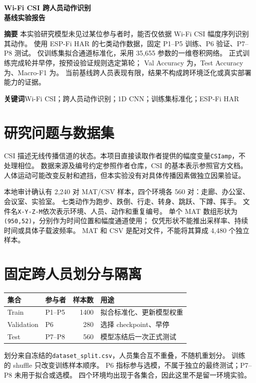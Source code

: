\documentclass[UTF8,zihao=-4,fontset=none]{ctexart}
\newcommand{\nextsection}{\FloatBarrier\Needspace{5\baselineskip}}
\begin{document}
\begin{center}
{\LARGE\sffamily\bfseries Wi-Fi CSI 跨人员动作识别\\[5pt]基线实验报告}\par
\vspace{5pt}{\large ESP32 / ESP-Fi HAR / LightweightCNN}\par
\vspace{4pt}{\small 一次固定划分、单一随机种子的冻结实验}
\end{center}
\noindent\textbf{摘要}\quad
本实验研究模型未见过某位参与者时，能否仅依据 Wi-Fi CSI 幅度序列识别其动作。
使用 ESP-Fi HAR 的七类动作数据，固定 P1--P5 训练、P6 验证、P7--P8 测试。
仅训练集拟合通道标准化，采用 35,655 参数的一维卷积网络。
正式训练完成\ActualEpochs{}轮并早停，按预设验证规则选定第\BestEpoch{}轮；
Val Accuracy 为\ValAcc{}，Test Accuracy 为\TestAcc{}、Macro-F1 为\TestFOne{}。
当前基线跨人员表现有限，结果不构成跨环境泛化或真实部署能力的证据。

\noindent\textbf{关键词}\quad Wi-Fi CSI；跨人员动作识别；1D CNN；训练集标准化；ESP-Fi HAR

\nextsection
\section{研究问题与数据集}
CSI 描述无线传播信道的状态。本项目直接读取作者提供的幅度变量\texttt{CSIamp}，不处理相位。
数据来源及编号约定参照作者仓库\cite{espfi}，CSI 的基本表示参照官方文档\cite{espcsi}。
人体运动可能改变反射和遮挡，但本实验没有对具体传播因素做独立因果验证。

本地审计确认有 2,240 对 MAT/CSV 样本，四个环境各 560 对：走廊、办公室、会议室、实验室。
七类动作为跑步、跌倒、行走、转身、跳跃、下蹲、挥手。
文件名\texttt{X-Y-Z-M}依次表示环境、人员、动作和重复编号。
单个 MAT 数组形状为\texttt{(950,52)}，分别作为时间位置和幅度通道使用；
仅凭形状不能推出采样率、持续时间或具体子载波频率。
MAT 和 CSV 是配对文件，不能将其算成 4,480 个独立样本。

\nextsection
\section{固定跨人员划分与隔离}
\begin{center}\begin{minipage}{\linewidth}\centering\small
{}
\begin{tabular}{llrl}\toprule
集合 & 参与者 & 样本数 & 用途\\\midrule
Train & P1--P5 & 1400 & 拟合标准化、更新模型权重\\
Validation & P6 & 280 & 选择 checkpoint、早停\\
Test & P7--P8 & 560 & 模型冻结后一次正式测试\\\bottomrule
\end{tabular}\end{minipage}\end{center}
划分来自冻结的\texttt{dataset\_split.csv}，人员集合互不重叠，不随机重划分。
训练的 shuffle 只改变训练样本顺序。
P6 指标参与选模，不属于独立的最终测试；P7--P8 未用于拟合或选模。
四个环境均出现于各集合，因此这里不是留一环境实验。
\end{document}
